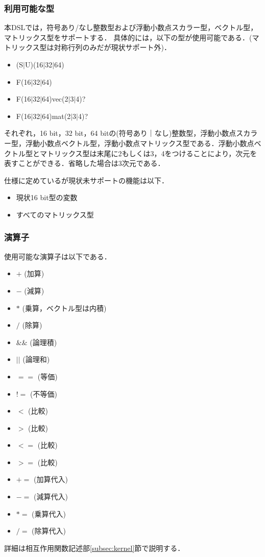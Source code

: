 \documentclass{article}
\begin{document}
\subsubsection{利用可能な型}
本DSLでは，符号あり/なし整数型および浮動小数点スカラー型，ベクトル型，マトリックス型をサポートする．
具体的には，以下の型が使用可能である．(マトリックス型は対称行列のみだが現状サポート外)．
 \begin{itemize}
  \item (S$|$U)(16$|$32$|$64)
  \item F(16$|$32$|$64)
  \item F(16$|$32$|$64)vec(2$|$3$|$4)?
  \item F(16$|$32$|$64)mat(2$|$3$|$4)?
 \end{itemize}
 それぞれ，16 bit，32 bit，64 bitの(符号あり｜なし)整数型，浮動小数点スカラー型，浮動小数点ベクトル型，浮動小数点マトリックス型である．浮動小数点ベクトル型とマトリックス型は末尾に2もしくは3，4をつけることにより，次元を表すことができる．省略した場合は3次元である．

 仕様に定めているが現状未サポートの機能は以下．
 \begin{itemize}
  \item 現状16 bit型の変数
  \item すべてのマトリックス型
 \end{itemize}

 \subsubsection{演算子}
 使用可能な演算子は以下である．
  \begin{itemize}
   \item $+$ (加算)
   \item $-$ (減算)
   \item $*$ (乗算，ベクトル型は内積)
   \item $/$ (除算)
   \item $\&\&$ (論理積)
   \item $||$ (論理和)
   \item $==$ (等価)
   \item $!=$ (不等価)
   \item $<$ (比較)
   \item $>$ (比較)
   \item $<=$ (比較)
   \item $>=$ (比較)
   \item $+=$ (加算代入)
   \item $-=$ (減算代入)
   \item $*=$ (乗算代入)
   \item $/=$ (除算代入)
  \end{itemize}
 詳細は相互作用関数記述部\ref{subsec:kernel}節で説明する．
\end{document}
